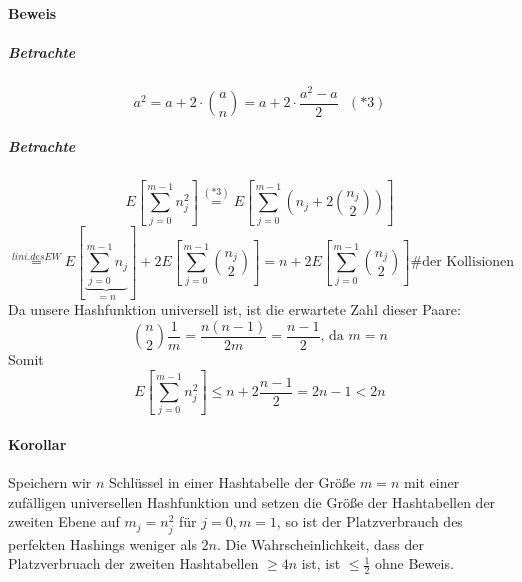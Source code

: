 \paragraph{Beweis}
\subparagraph{Betrachte}
\[ a^2= a+2\cdot\binom{a}{n}=a+2\cdot\frac{a^2-a}{2}~~~(*3) \]
\subparagraph{Betrachte}
\[ E\left[ \sum_{j=0}^{m-1} n_j^2\right] \overset{(*3)}{=} E \left[ \sum_{j=0}^{m-1} \left(n_j+2\binom{n_j}{2}\right) \right] \]
\[ \overset{lini. des EW}{=} E \left[ \underset{=n}{\underbrace{\sum_{j=0}^{m-1}n_j}} \right]+2E\left[ \sum_{j=0}^{m-1}\binom{n_j}{2} \right]=n+2E\left[ \sum_{j=0}^{m-1} \binom{n_j}{2}\right] \text{\# der Kollisionen}\]
Da unsere Hashfunktion universell ist, ist die erwartete Zahl dieser Paare:
\[ \binom{n}{2}\frac{1}{m}=\frac{n(n-1)}{2m}=\frac{n-1}{2}\text{, da }m=n \]
Somit
\[ E\left[ \sum_{j=0}^{m-1} n_j^2\right] \leq n+2\frac{n-1}{2}=2n-1<2n \]
\paragraph{Korollar}
Speichern wir $n$ Schlüssel in einer Hashtabelle der Größe $m=n$ mit einer zufälligen universellen Hashfunktion und setzen die Größe der Hashtabellen der zweiten Ebene auf $m_j=n_j^2$ für $j=0, m=1$, so ist der Platzverbrauch des perfekten Hashings weniger als $2n$. Die Wahrscheinlichkeit, dass der Platzverbruach der zweiten Hashtabellen $\geq 4n$ ist, ist $\leq \frac{1}{2}$ ohne Beweis.